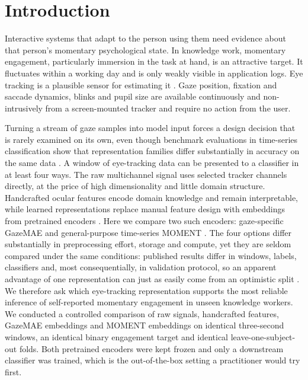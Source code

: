 \section{Introduction}

Interactive systems that adapt to the person using them need evidence about that person's momentary psychological state.
In knowledge work, momentary engagement, particularly immersion in the task at hand, is an attractive target.
It fluctuates within a working day and is only weakly visible in application logs.
Eye tracking is a plausible sensor for estimating it \cite{kahneman1966pupil,rayner1998reading}.
Gaze position, fixation and saccade dynamics, blinks and pupil size are available continuously and non-intrusively from a screen-mounted tracker and require no action from the user.

Turning a stream of gaze samples into model input forces a design decision that is rarely examined on its own, even though benchmark evaluations in time-series classification show that representation families differ substantially in accuracy on the same data \cite{middlehurst2024bakeoff}.
A window of eye-tracking data can be presented to a classifier in at least four ways.
The raw multichannel signal uses selected tracker channels directly, at the price of high dimensionality and little domain structure.
Handcrafted ocular features encode domain knowledge and remain interpretable, while learned representations replace manual feature design with embeddings from pretrained encoders \cite{bixler2016mindwandering,bozak2026workload,bozak2024emotion,fridman2018cognitive}.
Here we compare two such encoders: gaze-specific GazeMAE and general-purpose time-series MOMENT \cite{bautista2020gazemae,goswami2024moment}.
The four options differ substantially in preprocessing effort, storage and compute, yet they are seldom compared under the same conditions: published results differ in windows, labels, classifiers and, most consequentially, in validation protocol, so an apparent advantage of one representation can just as easily come from an optimistic split \cite{rosenblatt2024leakage}.
We therefore ask which eye-tracking representation supports the most reliable inference of self-reported momentary engagement in unseen knowledge workers.
We conducted a controlled comparison of raw signals, handcrafted features, GazeMAE embeddings and MOMENT embeddings on identical three-second windows, an identical binary engagement target and identical leave-one-subject-out folds.
Both pretrained encoders were kept frozen and only a downstream classifier was trained, which is the out-of-the-box setting a practitioner would try first.
